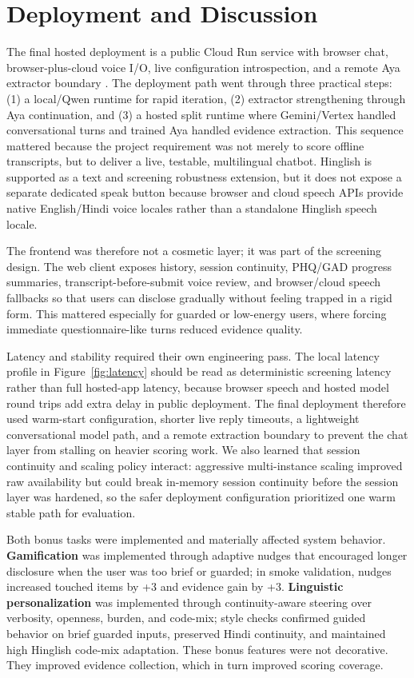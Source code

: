 \documentclass[11pt]{article}
\begin{document}
\section{Deployment and Discussion}
The final hosted deployment is a public Cloud Run service with browser chat, browser-plus-cloud voice I/O, live configuration introspection, and a remote Aya extractor boundary \citep{google2026cloudrun,google2026stt,google2026tts}. The deployment path went through three practical steps: (1) a local/Qwen runtime for rapid iteration, (2) extractor strengthening through Aya continuation, and (3) a hosted split runtime where Gemini/Vertex handled conversational turns and trained Aya handled evidence extraction. This sequence mattered because the project requirement was not merely to score offline transcripts, but to deliver a live, testable, multilingual chatbot. Hinglish is supported as a text and screening robustness extension, but it does not expose a separate dedicated speak button because browser and cloud speech APIs provide native English/Hindi voice locales rather than a standalone Hinglish speech locale.

The frontend was therefore not a cosmetic layer; it was part of the screening design. The web client exposes history, session continuity, PHQ/GAD progress summaries, transcript-before-submit voice review, and browser/cloud speech fallbacks so that users can disclose gradually without feeling trapped in a rigid form. This mattered especially for guarded or low-energy users, where forcing immediate questionnaire-like turns reduced evidence quality.

Latency and stability required their own engineering pass. The local latency profile in Figure~\ref{fig:latency} should be read as deterministic screening latency rather than full hosted-app latency, because browser speech and hosted model round trips add extra delay in public deployment. The final deployment therefore used warm-start configuration, shorter live reply timeouts, a lightweight conversational model path, and a remote extraction boundary to prevent the chat layer from stalling on heavier scoring work. We also learned that session continuity and scaling policy interact: aggressive multi-instance scaling improved raw availability but could break in-memory session continuity before the session layer was hardened, so the safer deployment configuration prioritized one warm stable path for evaluation.

Both bonus tasks were implemented and materially affected system behavior. \textbf{Gamification} was implemented through adaptive nudges that encouraged longer disclosure when the user was too brief or guarded; in smoke validation, nudges increased touched items by +3 and evidence gain by +3. \textbf{Linguistic personalization} was implemented through continuity-aware steering over verbosity, openness, burden, and code-mix; style checks confirmed guided behavior on brief guarded inputs, preserved Hindi continuity, and maintained high Hinglish code-mix adaptation. These bonus features were not decorative. They improved evidence collection, which in turn improved scoring coverage.
\end{document}
